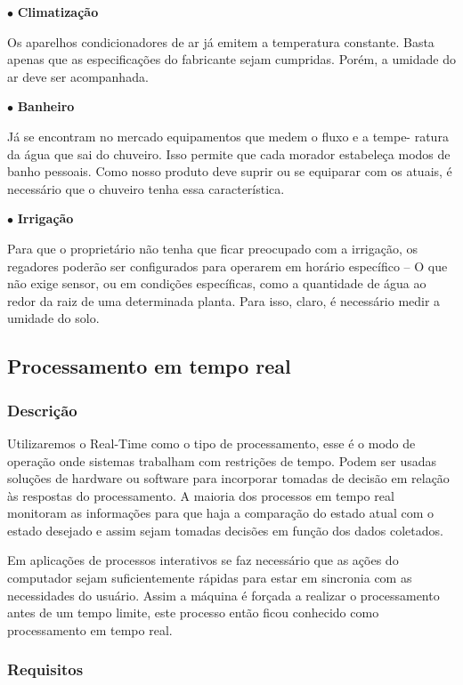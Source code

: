 $\bullet$ \textbf{Climatização}

	Os aparelhos condicionadores de ar já emitem a temperatura constante. Basta apenas que as especificações do fabricante sejam cumpridas. Porém, a umidade do ar deve ser acompanhada.

$\bullet$ \textbf{Banheiro}
	
	Já se encontram no mercado equipamentos que medem o fluxo e a tempe- ratura da água que sai do chuveiro. Isso permite que cada morador estabeleça modos de banho pessoais. Como nosso produto deve suprir ou se equiparar com
os atuais, é necessário que o chuveiro tenha essa característica.

$\bullet$ \textbf{Irrigação}

	Para que o proprietário não tenha que ficar preocupado com a irrigação, os regadores poderão ser configurados para operarem em horário específico – O que não exige sensor, ou em condições específicas, como a quantidade de água ao redor da raiz de uma determinada planta. Para isso, claro, é necessário medir a umidade do solo.


\subsection{Processamento em tempo real}

\subsubsection{Descrição}

	Utilizaremos o Real-Time como o tipo de processamento, esse é o modo de operação onde sistemas trabalham com restrições de tempo. Podem ser usadas soluções de hardware ou software para incorporar tomadas de decisão em relação às respostas do processamento. A maioria dos processos em tempo real monitoram as informações para que haja a comparação do estado atual com o estado desejado e assim sejam tomadas decisões em função dos dados coletados. 

	Em aplicações de processos interativos se faz necessário que as ações do computador sejam suficientemente rápidas para estar em sincronia com as necessidades do usuário. Assim a máquina é forçada a realizar o processamento antes de um tempo limite, este processo então ficou conhecido como processamento em tempo real.

\subsubsection{Requisitos}

